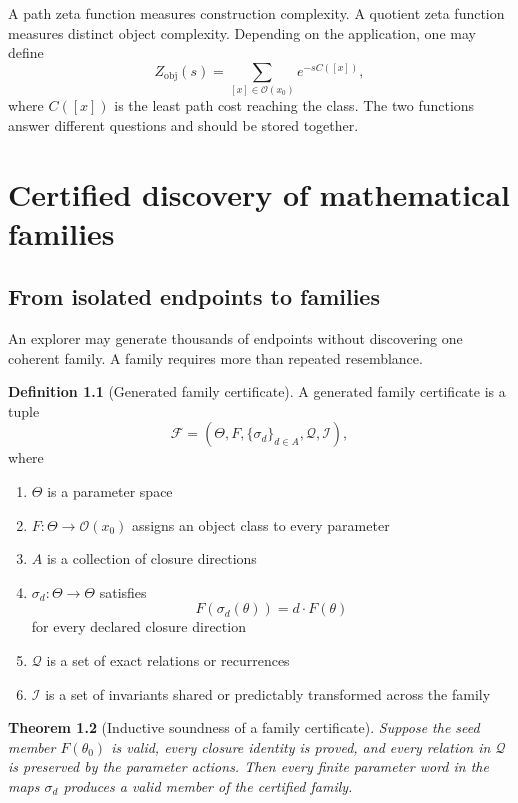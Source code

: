 \documentclass[11pt,openany]{report}
\newtheorem{theorem}{Theorem}[chapter]
\theoremstyle{definition}
\newtheorem{definition}[theorem]{Definition}
\theoremstyle{remark}
\newcommand{\Ocal}{\mathcal O}
\newcommand{\Fcal}{\mathcal F}
\begin{document}
A path zeta function measures construction complexity. A quotient zeta function measures distinct object complexity. Depending on the application, one may define
\[
Z_{\mathrm{obj}}(s)
=
\sum_{[x]\in\Ocal(x_0)}e^{-sC([x])},
\]
where $C([x])$ is the least path cost reaching the class. The two functions answer different questions and should be stored together.

\chapter{Certified discovery of mathematical families}

\section{From isolated endpoints to families}

An explorer may generate thousands of endpoints without discovering one coherent family. A family requires more than repeated resemblance.

\begin{definition}[Generated family certificate]
A generated family certificate is a tuple
\[
\Fcal=(\Theta,F,\{\sigma_d\}_{d\in A},\mathcal Q,\mathcal I),
\]
where
\begin{enumerate}[label=(\alph*)]
\item $\Theta$ is a parameter space
\item $F:\Theta\to\Ocal(x_0)$ assigns an object class to every parameter
\item $A$ is a collection of closure directions
\item $\sigma_d:\Theta\to\Theta$ satisfies
\[
F(\sigma_d(\theta))=d\cdot F(\theta)
\]
for every declared closure direction
\item $\mathcal Q$ is a set of exact relations or recurrences
\item $\mathcal I$ is a set of invariants shared or predictably transformed across the family
\end{enumerate}
\end{definition}

\begin{theorem}[Inductive soundness of a family certificate]
Suppose the seed member $F(\theta_0)$ is valid, every closure identity is proved, and every relation in $\mathcal Q$ is preserved by the parameter actions. Then every finite parameter word in the maps $\sigma_d$ produces a valid member of the certified family.
\end{theorem}
\end{document}
